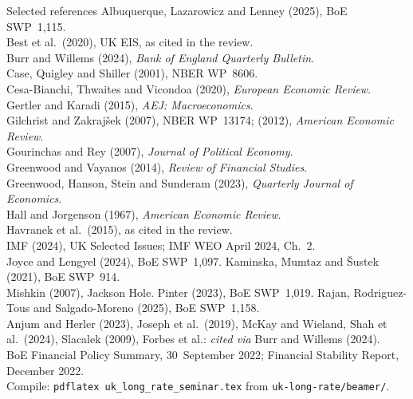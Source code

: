 \documentclass[11pt,aspectratio=169]{beamer}
\begin{document}
\begin{frame}{Selected references}
  {\scriptsize
  Albuquerque, Lazarowicz and Lenney (2025), BoE SWP~1,115.\\
  Best et al.\ (2020), UK EIS, as cited in the review.\\
  Burr and Willems (2024), \emph{Bank of England Quarterly Bulletin}.\\
  Case, Quigley and Shiller (2001), NBER WP~8606.\\
  Cesa-Bianchi, Thwaites and Vicondoa (2020), \emph{European Economic Review}.\\
  Gertler and Karadi (2015), \emph{AEJ: Macroeconomics}.\\
  Gilchrist and Zakraj\v{s}ek (2007), NBER WP~13174;
  (2012), \emph{American Economic Review}.\\
  Gourinchas and Rey (2007), \emph{Journal of Political Economy}.\\
  Greenwood and Vayanos (2014), \emph{Review of Financial Studies}.\\
  Greenwood, Hanson, Stein and Sunderam (2023), \emph{Quarterly Journal of Economics}.\\
  Hall and Jorgenson (1967), \emph{American Economic Review}.\\
  Havranek et al.\ (2015), as cited in the review.\\
  IMF (2024), UK Selected Issues; IMF WEO April 2024, Ch.~2.\\
  Joyce and Lengyel (2024), BoE SWP~1,097.
  Kaminska, Mumtaz and \v{S}ustek (2021), BoE SWP~914.\\
  Mishkin (2007), Jackson Hole.
  Pinter (2023), BoE SWP~1,019.
  Rajan, Rodriguez-Tous and Salgado-Moreno (2025), BoE SWP~1,158.\\
  Anjum and Herler (2023), Joseph et al.\ (2019), McKay and Wieland,
  Shah et al.\ (2024), Slacalek (2009), Forbes et al.:
  \emph{cited via} Burr and Willems (2024).\\
  BoE Financial Policy Summary, 30~September 2022;
  Financial Stability Report, December 2022.\\
  Compile: \texttt{pdflatex uk\_long\_rate\_seminar.tex}
  from \texttt{uk-long-rate/beamer/}.
  }
\end{frame}
\end{document}
